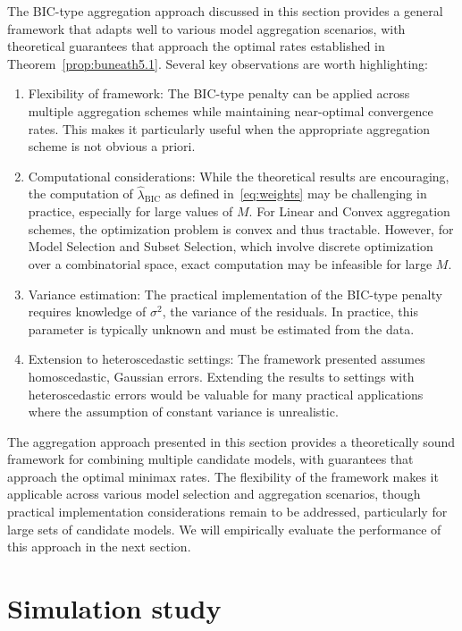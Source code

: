 \documentclass[11pt, letter paper]{article}
\newcommand{\1}{\mathmybb{1}}
\newcommand{\0}{\emptyset}
\newcommand{\lambdahat}[1]{\hat{\lambda}_{#1}}
\begin{document}
The BIC-type aggregation approach discussed in this section provides a general framework that adapts well to various model aggregation scenarios, with theoretical guarantees that approach the optimal rates established in Theorem~\ref{prop:buneath5.1}. Several key observations are worth highlighting:
\begin{enumerate}
    \item Flexibility of framework: The BIC-type penalty can be applied across multiple aggregation schemes while maintaining near-optimal convergence rates. This makes it particularly useful when the appropriate aggregation scheme is not obvious a priori.
    \item Computational considerations: While the theoretical results are encouraging, the computation of $\lambdahat{\text{BIC}}$ as defined in~\eqref{eq:weights} may be challenging in practice, especially for large values of $M$. For Linear and Convex aggregation schemes, the optimization problem is convex and thus tractable. However, for Model Selection and Subset Selection, which involve discrete optimization over a combinatorial space, exact computation may be infeasible for large $M$.
    \item Variance estimation: The practical implementation of the BIC-type penalty requires knowledge of $\sigma^2$, the variance of the residuals. In practice, this parameter is typically unknown and must be estimated from the data.
    \item Extension to heteroscedastic settings: The framework presented assumes homoscedastic, Gaussian errors. Extending the results to settings with heteroscedastic errors would be valuable for many practical applications where the assumption of constant variance is unrealistic.
\end{enumerate}

The aggregation approach presented in this section provides a theoretically sound framework for combining multiple candidate models, with guarantees that approach the optimal minimax rates. The flexibility of the framework makes it applicable across various model selection and aggregation scenarios, though practical implementation considerations remain to be addressed, particularly for large sets of candidate models. We will empirically evaluate the performance of this approach in the next section.


\section{Simulation study}\label{sec:simulations}


\newpage
\printbibliography{}
\end{document}
